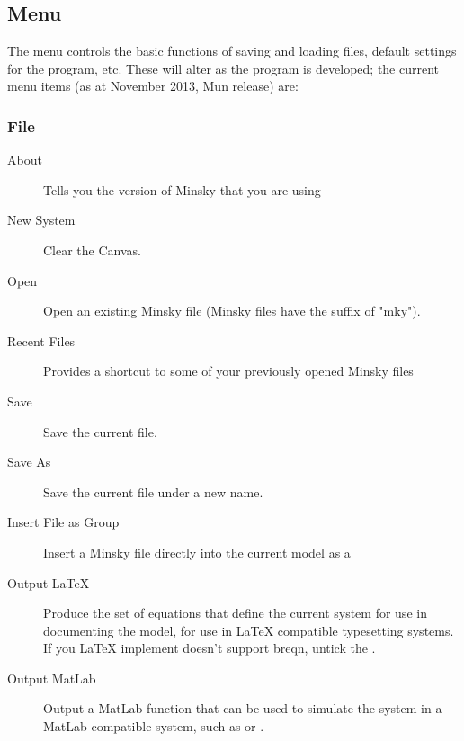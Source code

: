 \subsection{Menu}
\label{Menu}



The menu controls the basic functions of saving and loading files,
default settings for the program, etc. These will alter as the program
is developed; the current menu items (as at November 2013, Mun release) are:

\subsubsection{File}
\label{File}

\begin{description}
\item[About] Tells you the version of Minsky that you are using

\item[New System] Clear the Canvas.

\item[Open] Open an existing Minsky file (Minsky files have the suffix of "mky").

\item[Recent Files]\label{recentfiles} Provides a shortcut to some of
your previously opened Minsky files

\item[Save] Save the current file.

\item[Save As] Save the current file under a new name.

\item[Insert File as Group] Insert a Minsky file directly into the
current model as a 

\item[Output LaTeX] Produce the set of equations that define the
  current system for use in documenting the model, for use in LaTeX
  compatible typesetting systems. If you LaTeX implement doesn't
  support breqn, untick the . 

\item[Output MatLab] Output a MatLab function that can be used to
simulate the system in a MatLab compatible system, such as
or .


\end{description}

